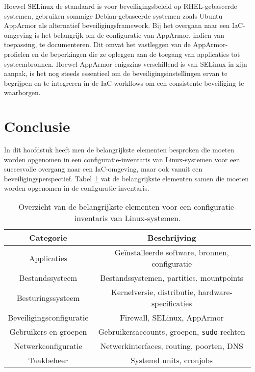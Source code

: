 Hoewel SELinux de standaard is voor beveiligingsbeleid op RHEL-gebaseerde systemen, gebruiken sommige Debian-gebaseerde systemen zoals Ubuntu AppArmor als alternatief beveiligingsframework.
Bij het overgaan naar een IaC-omgeving is het belangrijk om de configuratie van AppArmor, indien van toepassing, te documenteren.
Dit omvat het vastleggen van de AppArmor-profielen en de beperkingen die ze opleggen aan de toegang van applicaties tot systeembronnen.
Hoewel AppArmor enigszins verschillend is van SELinux in zijn aanpak, is het nog steeds essentieel om de beveiligingsinstellingen ervan te begrijpen en te integreren in de IaC-workflows om een consistente beveiliging te waarborgen.

\section{Conclusie}
\label{risico_conclusie}

In dit hoofdstuk heeft men de belangrijkste elementen besproken die moeten worden opgenomen in een configuratie-inventaris van Linux-systemen voor een succesvolle overgang naar een IaC-omgeving, maar ook vanuit een beveiligingsperspectief.
Tabel~\ref{table:risico_conclusie} vat de belangrijkste elementen samen die moeten worden opgenomen in de configuratie-inventaris.

\begin{table}[!h]
    \begin{center}
        \begin{tabular}{ c c }
            \hline
                Categorie & Beschrijving \\ [0.5ex] 
            \hline
                Applicaties              & Ge\"installeerde software, bronnen, configuratie \\
                Bestandssysteem          & Bestandssystemen, partities, mountpoints \\
                Besturingssysteem        & Kernelversie, distributie, hardware-specificaties \\
                Beveiligingsconfiguratie & Firewall, SELinux, AppArmor \\
                Gebruikers en groepen    & Gebruikersaccounts, groepen, \texttt{sudo}-rechten \\
                Netwerkconfiguratie      & Netwerkinterfaces, routing, poorten, DNS \\
                Taakbeheer               & Systemd units, cronjobs \\
        \end{tabular}
    \end{center}
    \caption[Belangrijke elementen configuratie-inventaris.]{Overzicht van de belangrijkste elementen voor een configuratie-inventaris van Linux-systemen.}
    \label{table:risico_conclusie}
\end{table}
